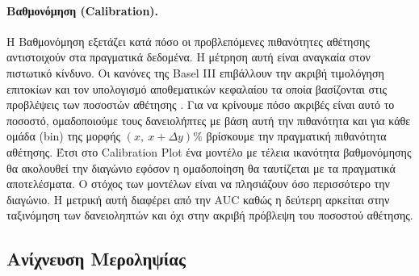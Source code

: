 \paragraph{Βαθμονόμηση (Calibration).}
Η Βαθμονόμηση εξετάζει κατά πόσο οι προβλεπόμενες πιθανότητες αθέτησης
αντιστοιχούν στα πραγματικά δεδομένα. Η μέτρηση αυτή είναι αναγκαία στον
πιστωτικό κίνδυνο. Οι κανόνες της Basel III επιβάλλουν την ακριβή τιμολόγηση
επιτοκίων και τον υπολογισμό αποθεματικών κεφαλαίου τα οποία βασίζονται στις
προβλέψεις των ποσοστών αθέτησης \citep{basel2017}. Για να κρίνουμε πόσο ακριβές είναι αυτό το
ποσοστό, ομαδοποιούμε τους δανειολήπτες με βάση αυτή την πιθανότητα και για
κάθε ομάδα (bin) της μορφής $(x,\ x+\Delta y)\%$ βρίσκουμε την πραγματική
πιθανότητα αθέτησης. Έτσι στο Calibration Plot ένα μοντέλο με τέλεια ικανότητα
βαθμονόμησης θα ακολουθεί την διαγώνιο εφόσον η ομαδοποίηση θα ταυτίζεται με
τα πραγματικά αποτελέσματα. Ο στόχος των μοντέλων είναι να πλησιάζουν όσο
περισσότερο την διαγώνιο. Η μετρική αυτή διαφέρει από την AUC καθώς η δεύτερη
αρκείται στην ταξινόμηση των δανειοληπτών και όχι στην ακριβή πρόβλεψη του
ποσοστού αθέτησης.

\subsection{Ανίχνευση Μεροληψίας}
\label{sec:bias_methodology}

